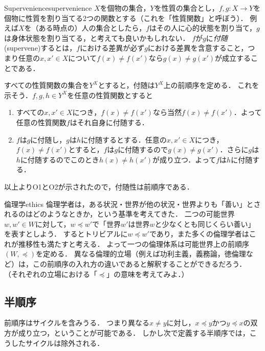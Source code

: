 \documentclass[dvipdfmx,11pt,a4paper]{jsarticle}
\begin{document}
\begin{rei}{Supervenience}{supervenience} %
 $X$を個物の集合，$Y$を性質の集合とし，$f, g:X \to Y$を個物に性質を割り当てる2つの関数とする（これを「性質関数」と呼ぼう）．
 例えば$X$を（ある時点の）人の集合としたら，$f$はその人に心的状態を割り当て，$g$は身体状態を割り当てる，と考えても良いかもしれない．
 $f$が$g$に\emph{付随}(supervene)するとは，$f$における差異が必ず$g$における差異を含意すること，つまり任意の$x, x' \in X$について$f(x) \neq f(x')$なら$g(x) \neq g(x')$が成立することである．

 すべての性質関数の集合を$Y^X$とすると，付随は$Y^X$上の前順序を定める．
 これを示そう．$f, g, h \in Y^X$を任意の性質関数とすると
 \begin{enumerate}
  \item すべての$x, x' \in X$につき，$f(x) \neq f(x')$なら当然$f(x) \neq f(x')$．よって任意の性質関数$f$はそれ自身に付随する．
  \item $f$は$g$に付随し，$g$は$h$に付随するとする．任意の$x, x' \in X$につき，$f(x) \neq f(x')$とすると，$f$は$g$に付随するので$g(x) \neq g(x')$．さらに$g$は$h$に付随するのでこのとき$h(x) \neq h(x')$が成り立つ．よって$f$は$h$に付随する．
 \end{enumerate}
以上よりO1とO2が示されたので，付随性は前順序である．
\end{rei}



\begin{rei}{倫理学}{ethics}
  倫理学者は，ある状況・世界が他の状況・世界よりも「善い」とされるのはどのようなときか，という基準を考えてきた．
  二つの可能世界$w, w' \in W$に対して，$w \preceq w'$で「世界$w'$は世界$w$と少なくとも同じくらい善い」を表すとしよう．
  するとトリビアルに$w \preceq w'$であり，また多くの倫理学者はこれが推移性も満たすと考える．
  よって一つの倫理体系は可能世界上の前順序$(W, \preceq)$を定める．
  異なる倫理的立場（例えば功利主義，義務論，徳倫理など）は，この前順序の入れ方の違いであると解釈することができるだろう．
  （それぞれの立場における「$\preceq$」の意味を考えてみよ．）
\end{rei}


\subsection{半順序}
前順序はサイクルを含みうる．
つまり異なる$x \neq y$に対し，$x \preceq y$かつ$y \preceq x$の双方が成り立つ，ということが可能である．
しかし次で定義する半順序では，こうしたサイクルは除外される．
\end{document}
